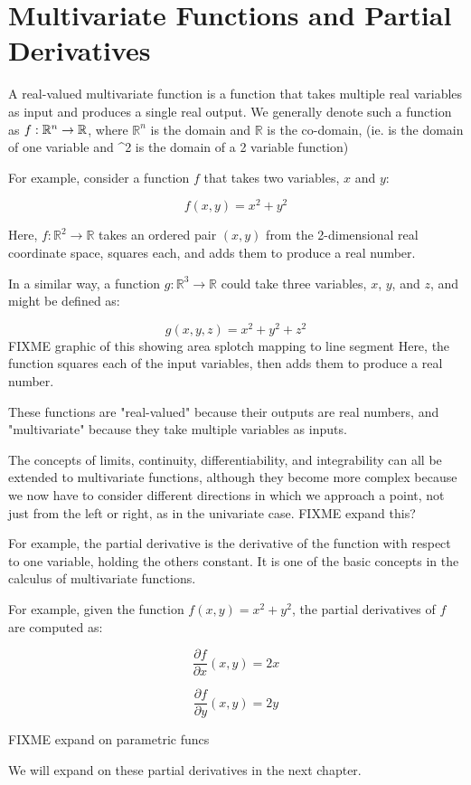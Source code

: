 \chapter{Multivariate Functions and Partial Derivatives}

A real-valued multivariate function is a function that takes multiple
real variables as input and produces a single real output.
We generally denote such a function as $f: \mathbb{R}^n \rightarrow
\index{multivariable function!domain}
\index{multivariable function!range}

\mathbb{R}$, where $\mathbb{R}^n$ is the domain and $\mathbb{R}$ is
the co-domain, (ie.  is the domain of one variable and ^2 is the domain of a 2 variable function)

For example, consider a function $f$ that takes two variables, $x$ and
$y$:

\begin{equation*}
f(x, y) = x^2 + y^2
\end{equation*}

Here, $f: \mathbb{R}^2 \rightarrow \mathbb{R}$ takes an ordered pair
$(x, y)$ from the 2-dimensional real coordinate space, squares each,
and adds them to produce a real number.

In a similar way, a function $g: \mathbb{R}^3 \rightarrow \mathbb{R}$
could take three variables, $x$, $y$, and $z$, and might be defined as:

\begin{equation*}
g(x, y,z) = x^2 + y^2 + z^2
\end{equation*}
FIXME graphic of this showing area splotch mapping to line segment
Here, the function squares each of the input variables, then adds
them to produce a real number.

These functions are "real-valued" because their outputs are real
numbers, and "multivariate" because they take multiple variables as
inputs.

The concepts of limits, continuity, differentiability, and
integrability can all be extended to multivariate functions, although
they become more complex because we now have to consider different
directions in which we approach a point, not just from the left or
right, as in the univariate case. FIXME expand this?

For example, the partial derivative
is the derivative of the function with respect to one variable,
holding the others constant. It is one of the basic concepts in the
calculus of multivariate functions.

For example, given the function $f(x, y) = x^2 + y^2$, the partial
derivatives of $f$ are computed as:

\begin{equation*}
\frac{\partial f}{\partial x}(x, y) = 2x
\end{equation*}

\begin{equation*}
\frac{\partial f}{\partial y}(x, y) = 2y
\end{equation*}

FIXME expand on parametric funcs

We will expand on these partial derivatives in the next chapter. 